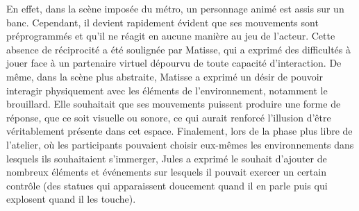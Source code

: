 En effet, dans la scène imposée du métro, un personnage animé est assis sur un banc. Cependant, il devient rapidement évident que ses mouvements sont 
préprogrammés et qu’il ne réagit en aucune manière au jeu de l’acteur. Cette absence de réciprocité a été soulignée par Matisse, qui a exprimé des 
difficultés à jouer face à un partenaire virtuel dépourvu de toute capacité d’interaction.
De même, dans la scène plus abstraite, Matisse a exprimé un désir de pouvoir interagir physiquement avec les éléments de l’environnement, 
notamment le brouillard. Elle souhaitait que ses mouvements puissent produire une forme de réponse, que ce soit visuelle ou sonore, ce qui aurait renforcé 
l’illusion d’être véritablement présente dans cet espace.
Finalement, lors de la phase plus libre de l’atelier, où les participants pouvaient choisir eux-mêmes les environnements dans lesquels ils souhaitaient s’immerger, 
Jules a exprimé le souhait d’ajouter de nombreux éléments et événements sur lesquels il pouvait exercer un certain contrôle (des statues qui apparaissent doucement quand
il en parle puis qui explosent quand il les touche). 

